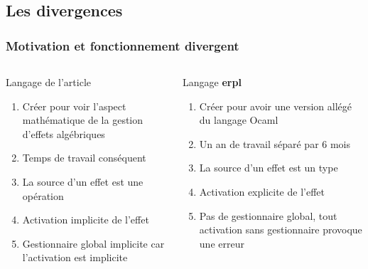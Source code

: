 \documentclass{beamer}
\begin{document}
\subsection{Les divergences}
\begin{frame}
	\frametitle{Motivation et fonctionnement divergent}
	\begin{columns}
		\begin{block}{Langage de l'article}
			\begin{enumerate}
				\item Créer pour voir l'aspect mathématique de la gestion d'effets algébriques
				\item Temps de travail conséquent
				\item La source d'un effet est une \alert{opération}
				\item Activation \alert{implicite} de l'effet
				\item Gestionnaire global implicite car l'activation est implicite
			\end{enumerate}
		\end{block}
		\begin{block}{Langage \textbf{erpl}}
			\begin{enumerate}
				\item Créer pour avoir une version allégé du langage Ocaml
				\item Un an de travail séparé par 6 mois 
				\item La source d'un effet est un \alert{type}
				\item Activation \alert{explicite} de l'effet
				\item Pas de gestionnaire global, tout activation sans gestionnaire provoque une erreur
			\end{enumerate}
		\end{block}
	\end{columns}
\end{frame}
\end{document}
